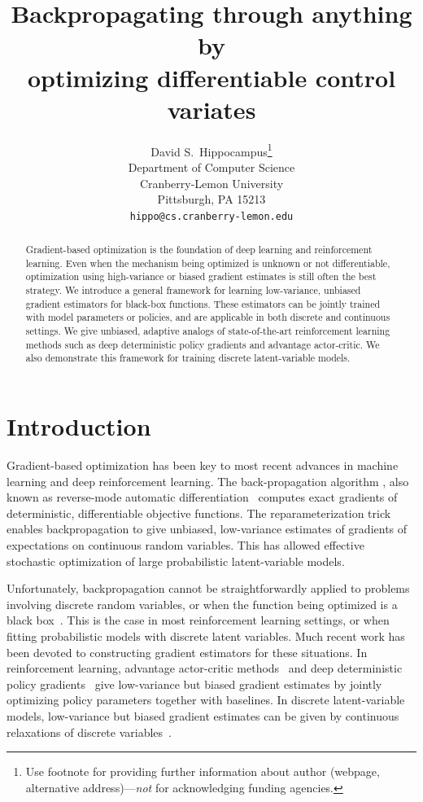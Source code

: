 \documentclass{article}
\title{Backpropagating through anything by\\ optimizing differentiable control variates}
\author{
  David S.~Hippocampus\thanks{Use footnote for providing further
    information about author (webpage, alternative
    address)---\emph{not} for acknowledging funding agencies.} \\
  Department of Computer Science\\
  Cranberry-Lemon University\\
  Pittsburgh, PA 15213 \\
  \texttt{hippo@cs.cranberry-lemon.edu} \\
}
\begin{document}
\maketitle
\begin{abstract}
Gradient-based optimization is the foundation of deep learning and reinforcement learning.
Even when the mechanism being optimized is unknown or not differentiable, optimization using high-variance or biased gradient estimates is still often the best strategy.
We introduce a general framework for learning low-variance, unbiased gradient estimators for black-box functions.
These estimators can be jointly trained with model parameters or policies, and are applicable in both discrete and continuous settings.
We give unbiased, adaptive analogs of state-of-the-art reinforcement learning methods such as deep deterministic policy gradients and advantage actor-critic.
We also demonstrate this framework for training discrete latent-variable models.
\end{abstract}


\section{Introduction}
Gradient-based optimization has been key to most recent advances in machine learning and deep reinforcement learning.
The back-propagation algorithm \citep{rumelhart1986learning}, also known as reverse-mode automatic differentiation~\citep{speelpenning1980compiling, rall1981automatic} computes exact gradients of deterministic, differentiable objective functions.
The reparameterization trick \citep{kingma2013autoencoding, rezende2014stochastic} enables backpropagation to give unbiased, low-variance estimates of gradients of expectations on continuous random variables.
This has allowed effective stochastic optimization of large probabilistic latent-variable models.

Unfortunately, backpropagation cannot be straightforwardly applied to problems involving discrete random variables, or when the function being optimized is a black box~\citep{schulman2015gradient}.
This is the case in most reinforcement learning settings, or when fitting probabilistic models with discrete latent variables.
Much recent work has been devoted to constructing gradient estimators for these situations.
In reinforcement learning, advantage actor-critic methods~\citep{mnih2016asynchronous} and deep deterministic policy gradients~\citep{lillicrap2015continuous} give low-variance but biased gradient estimates by jointly optimizing policy parameters together with baselines.
In discrete latent-variable models, low-variance but biased gradient estimates can be given by continuous relaxations of discrete variables~\citep{maddison2016concrete, jang2016categorical}.
\end{document}
